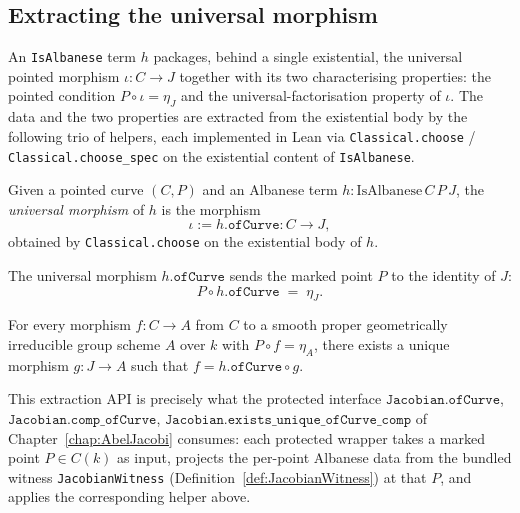 \subsection{Extracting the universal morphism}
An \texttt{IsAlbanese} term \(h\) packages, behind a single existential, the universal pointed morphism \(\iota \colon C \to J\) together with its two characterising properties: the pointed condition \(P \circ \iota = \eta_J\) and the universal-factorisation property of \(\iota\). The data and the two properties are extracted from the existential body by the following trio of helpers, each implemented in Lean via \texttt{Classical.choose} / \texttt{Classical.choose\_spec} on the existential content of \texttt{IsAlbanese}.
\begin{definition}
  \label{def:IsAlbanese_ofCurve}

  Given a pointed curve \((C, P)\) and an Albanese term \(h \colon \mathrm{IsAlbanese}\,C\,P\,J\), the \emph{universal morphism} of \(h\) is the morphism
  \[
    \iota := h.\mathtt{ofCurve} \colon C \to J,
  \]
  obtained by \texttt{Classical.choose} on the existential body of \(h\).
\end{definition}
\begin{lemma}
  \label{lem:IsAlbanese_comp_ofCurve}

  The universal morphism \(h.\mathtt{ofCurve}\) sends the marked point \(P\) to the identity of \(J\):
  \[
    P \circ h.\mathtt{ofCurve} \;=\; \eta_J.
  \]
\end{lemma}
\begin{lemma}
  \label{lem:IsAlbanese_exists_unique_ofCurve_comp}

  For every morphism \(f \colon C \to A\) from \(C\) to a smooth proper geometrically irreducible group scheme \(A\) over \(k\) with \(P \circ f = \eta_A\), there exists a unique morphism \(g \colon J \to A\) such that \(f = h.\mathtt{ofCurve} \circ g\).
\end{lemma}
This extraction API is precisely what the protected interface \(\mathtt{Jacobian.ofCurve}\), \(\mathtt{Jacobian.comp\_ofCurve}\), \(\mathtt{Jacobian.exists\_unique\_ofCurve\_comp}\) of Chapter~\ref{chap:AbelJacobi} consumes: each protected wrapper takes a marked point \(P \in C(k)\) as input, projects the per-point Albanese data from the bundled witness \texttt{JacobianWitness} (Definition~\ref{def:JacobianWitness}) at that \(P\), and applies the corresponding helper above.
